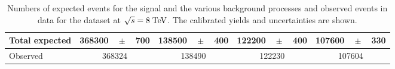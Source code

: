 \begin{table}
\begin{tabular}{ l  rrr  rrr  rrr  rrr }
    Total expected              & 368300 &$\!\!\!\pm\!\!\!$& 700    & 138500 &$\!\!\!\pm\!\!\!$& 400  & 122200 &$\!\!\!\pm\!\!\!$& 400 & 107600 &$\!\!\!\pm\!\!\!$& 330 \\
    \midrule                                                                                                                                                            
    Observed                    & \multicolumn{3}{c}{368324}        & \multicolumn{3}{c}{138490}      & \multicolumn{3}{c}{122230}     & \multicolumn{3}{c}{107604}     \\
    \bottomrule
  \end{tabular}
  \caption[Event yields for the \mujets{} samples at $\sqrt{s} = 8 \TeV{}$]{
    Numbers of expected events for the \ttbar{} signal and the various background 
    processes and observed events in data for the \mujets{} dataset
    at $\sqrt{s} = 8 \TeV{}$.
    The calibrated yields and uncertainties are shown.}
  \label{tab:yields2012mu}
\end{table}

